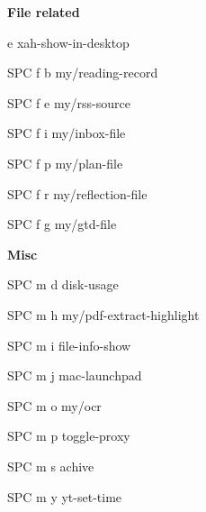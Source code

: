 \documentclass[10pt]{article}
\renewcommand\subsection[1]{\smallskip\par\textbf{\color{heading}#1}}
\begin{document}
\begin{multicols}{4}
  \subsection{File related}
  \begin{keylist}
    \item[e] xah-show-in-desktop
    \item[SPC f b] my/reading-record
    \item[SPC f e] my/rss-source
    \item[SPC f i] my/inbox-file
    \item[SPC f p] my/plan-file
    \item[SPC f r] my/reflection-file
    \item[SPC f g] my/gtd-file
  \end{keylist}

  \subsection{Misc}
  \begin{keylist}
    \item[SPC m d] disk-usage
    \item[SPC m h] my/pdf-extract-highlight
    \item[SPC m i] file-info-show
    \item[SPC m j] mac-launchpad
    \item[SPC m o] my/ocr
    \item[SPC m p] toggle-proxy
    \item[SPC m s] achive
    \item[SPC m y] yt-set-time
  \end{keylist}


\end{multicols}
\end{document}
